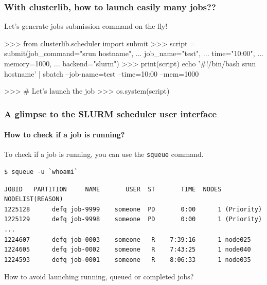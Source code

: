 \documentclass[11pt,compress,serif]{beamer}
\begin{document}
\begin{frame}[fragile=singleslide]
\frametitle{With clusterlib, how to launch easily many jobs??}

Let's generate jobs submission command on the fly!

\begin{pythoncode}
>>> from clusterlib.scheduler import submit
>>> script = submit(job_command="srun hostname", 
...                 job_name="test",
...                 time="10:00", 
...                 memory=1000, 
...                 backend="slurm")
>>> print(script)
echo '#!/bin/bash
srun hostname' | sbatch --job-name=test --time=10:00 --mem=1000 

>>> # Let's launch the job
>>> os.system(script)
\end{pythoncode}
    
\end{frame}


\begin{frame}[fragile=singleslide]
\frametitle{A glimpse to the SLURM scheduler user interface}
\framesubtitle{How to check if a job is running?}

To check if a job is running, you can use the \texttt{squeue} command.

\begin{verbatim}
$ squeue -u `whoami`
\end{verbatim}

\begin{verbatim}
JOBID   PARTITION     NAME       USER  ST       TIME  NODES NODELIST(REASON)
1225128      defq job-9999    someone  PD       0:00      1 (Priority)
1225129      defq job-9998    someone  PD       0:00      1 (Priority)
...
1224607      defq job-0003    someone   R    7:39:16      1 node025
1224605      defq job-0002    someone   R    7:43:25      1 node040
1224593      defq job-0001    someone   R    8:06:33      1 node035
\end{verbatim}

\vfill

\alert{How to avoid launching running, queued or completed jobs?}

\end{frame}
\end{document}
